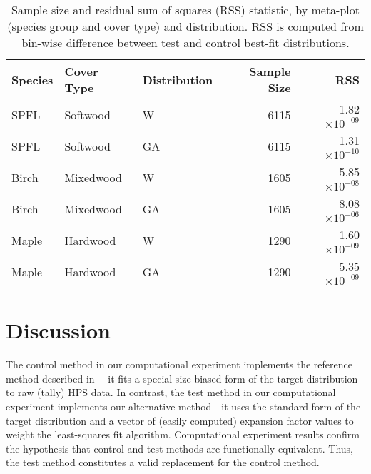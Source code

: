 \message{ !name(hpsdistfit_article.tex)}\documentclass{article}
\begin{document}
\begin{table}[h!]
\caption{Sample size and residual sum of squares (RSS) statistic, by meta-plot
  (species group and cover type) and distribution. RSS is computed from bin-wise difference between test and control best-fit distributions.}
\vspace{1em}
\label{tab:rss}
\centering
\begin{tabular}{lllrr}
\toprule
  Species & Cover Type & Distribution &  Sample Size &           RSS \\
  \midrule
  SPFL &   Softwood &  W &       6115 &  1.82 $\times 10^{-09}$ \\
  SPFL &   Softwood &  GA &       6115 &  1.31 $\times 10^{-10}$ \\
  Birch &  Mixedwood &   W &      1605 &  5.85 $\times 10^{-08}$ \\
  Birch &  Mixedwood &     GA &    1605 &  8.08 $\times 10^{-06}$  \\
  Maple &   Hardwood &      W &   1290 &  1.60 $\times 10^{-09}$ \\
  Maple &   Hardwood &      GA &   1290 &  5.35 $\times 10^{-09}$ \\
\bottomrule
\end{tabular}
\end{table}




\section{Discussion}
\label{sec:discussion}

The control method in our computational experiment implements the reference method described in
\citet{ducey2015sizebiased}---it fits a special size-biased form of the target distribution to raw (tally) HPS data. 
In contrast, the test method in our computational experiment
implements our alternative method---it uses the standard form of the target
distribution and a vector of (easily computed) expansion factor values
to weight the least-squares fit algorithm.
Computational experiment results confirm the hypothesis that control and
test methods are functionally equivalent. 
Thus, the test method constitutes a valid replacement for the control
method.
\end{document}
